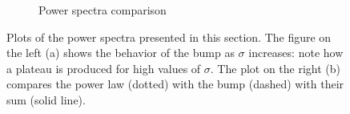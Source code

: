 \begin{figure}
\begin{subfigure}[b]{0.45\textwidth}
\caption{Power spectra comparison}
\label{fig:PS_comp}
\end{subfigure}
\caption{Plots of the power spectra presented in this section. The figure on the left (a) shows the behavior of the bump as $\sigma$ increases: note how a plateau is produced for high values of $\sigma$. The plot on the right (b) compares the power law (dotted) with the bump (dashed) with their sum (solid line). }
\end{figure}

 

